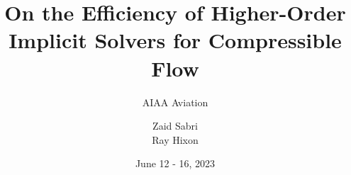 \title{On the Efficiency of Higher-Order Implicit Solvers for Compressible Flow}
\subtitle{AIAA Aviation}
\author[Z. Sabri, R. Hixon]{Zaid Sabri \\ Ray Hixon}


\date{June 12 - 16, 2023}
